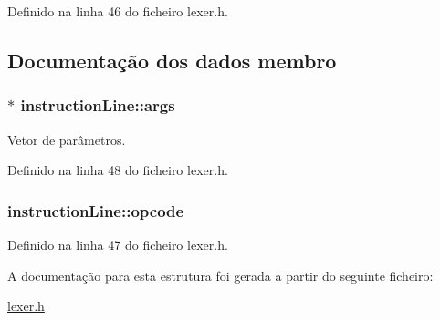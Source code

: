 Definido na linha 46 do ficheiro lexer.\-h.



\subsection{Documentação dos dados membro}
\hypertarget{structinstruction_line_ab6b4be43f89da78d09a9469f952435c7}{
\subsubsection[{args}]{$\ast$ instruction\-Line\-::args}}\label{structinstruction_line_ab6b4be43f89da78d09a9469f952435c7}


Vetor de parâmetros. 



Definido na linha 48 do ficheiro lexer.\-h.

\hypertarget{structinstruction_line_a309feca274873683d12f90cf0bd81780}{
\subsubsection[{opcode}]{ instruction\-Line\-::opcode}}\label{structinstruction_line_a309feca274873683d12f90cf0bd81780}


Definido na linha 47 do ficheiro lexer.\-h.



A documentação para esta estrutura foi gerada a partir do seguinte ficheiro\-:\begin{DoxyCompactItemize}
\item 
\hyperlink{lexer_8h}{lexer.\-h}\end{DoxyCompactItemize}
